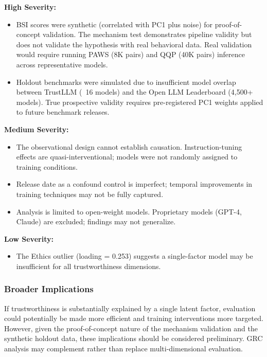 \textbf{High Severity:}
\begin{itemize}
\item BSI scores were synthetic (correlated with PC1 plus noise) for proof-of-concept validation. The mechanism test demonstrates pipeline validity but does not validate the hypothesis with real behavioral data. Real validation would require running PAWS (8K pairs) and QQP (40K pairs) inference across representative models.
\item Holdout benchmarks were simulated due to insufficient model overlap between TrustLLM (~16 models) and the Open LLM Leaderboard (4,500+ models). True prospective validity requires pre-registered PC1 weights applied to future benchmark releases.
\end{itemize}

\textbf{Medium Severity:}
\begin{itemize}
\item The observational design cannot establish causation. Instruction-tuning effects are quasi-interventional; models were not randomly assigned to training conditions.
\item Release date as a confound control is imperfect; temporal improvements in training techniques may not be fully captured.
\item Analysis is limited to open-weight models. Proprietary models (GPT-4, Claude) are excluded; findings may not generalize.
\end{itemize}

\textbf{Low Severity:}
\begin{itemize}
\item The Ethics outlier (loading = 0.253) suggests a single-factor model may be insufficient for all trustworthiness dimensions.
\end{itemize}

\subsubsection{Broader Implications}

If trustworthiness is substantially explained by a single latent factor, evaluation could potentially be made more efficient and training interventions more targeted. However, given the proof-of-concept nature of the mechanism validation and the synthetic holdout data, these implications should be considered preliminary. GRC analysis may complement rather than replace multi-dimensional evaluation.

